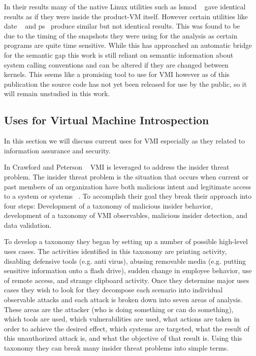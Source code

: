 In their results many of the native Linux utilities such as lsmod ~\cite{kerrisk_lsmod8_2014} gave identical results as if they were inside the product-VM itself. However certain utilities like date ~\cite{mackenzie_date1_????} and ps~\cite{lankester_ps1_????} produce similar but not identical results. This was found to be due to the timing of the snapshots they were using for the analysis as certain programs are quite time sensitive. While this has approached an automatic bridge for the semantic gap this work is still reliant on semantic information about system calling conventions and can be altered if they are changed between kernels. This seems like a promising tool to use for VMI however as of this publication the source code has not yet been released for use by the public, so it will remain unstudied in this work. 


\subsection{Uses for Virtual Machine Introspection}
In this section we will discuss current uses for VMI especially as they related to information assurance and security. 

In Crawford and Peterson ~\cite{crawford_insider_2013} VMI is leveraged to address the insider threat problem.  The insider threat problem is the situation that occurs when current or past members of an organization have both malicious intent and legitimate access to a system or systems ~\cite{rushby_critical_1994}. To accomplish their goal they break their approach into four steps: Development of a taxonomy of malicious insider behavior, development of a taxonomy of VMI observables, malicious insider detection, and data validation. 

To develop a taxonomy they began by setting up a number of possible high-level uses cases. The activities identified in this taxonomy are printing activity, disabling defensive tools (e.g. anti virus), abusing removable media (e.g. putting sensitive information onto a flash drive), sudden change in employee behavior, use of remote access, and strange clipboard activity. Once they determine major uses cases they wish to look for they decompose each scenario into individual observable attacks and each attack is broken down into seven areas of analysis. These areas are the attacker (who is doing something or can do something), which tools are used, which vulnerabilities are used, what actions are taken in order to achieve the desired effect, which systems are targeted, what the result of this unauthorized attack is, and what the objective of that result is. Using this taxonomy they can break many insider threat problems into simple terms. 

